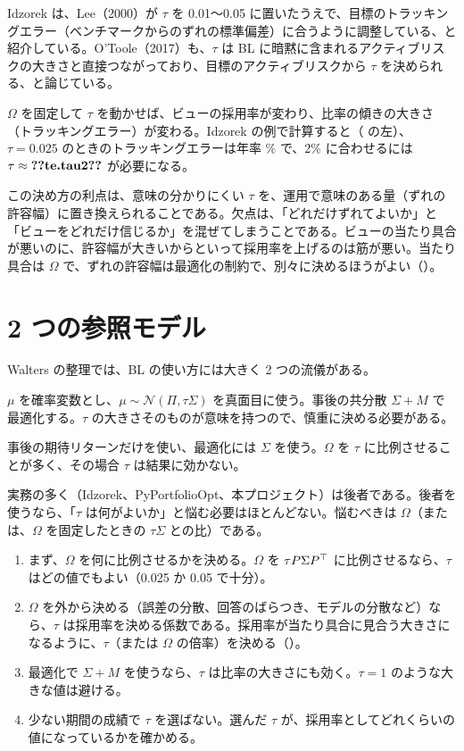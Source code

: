 Idzorek は、Lee（2000）が $\tau$ を 0.01〜0.05 に置いたうえで、目標のトラッキングエラー（ベンチマークからのずれの標準偏差）に合うように調整している、と紹介している。O'Toole（2017）も、$\tau$ は BL に暗黙に含まれるアクティブリスクの大きさと直接つながっており、目標のアクティブリスクから $\tau$ を決められる、と論じている。

$\Omega$ を固定して $\tau$ を動かせば、ビューの採用率が変わり、比率の傾きの大きさ（トラッキングエラー）が変わる。Idzorek の例で計算すると（ の左）、$\tau=0.025$ のときのトラッキングエラーは年率 \% で、2\% に合わせるには $\tau\approx\V{te.tau2}$ が必要になる。

この決め方の利点は、意味の分かりにくい $\tau$ を、運用で意味のある量（ずれの許容幅）に置き換えられることである。欠点は、「どれだけずれてよいか」と「ビューをどれだけ信じるか」を混ぜてしまうことである。ビューの当たり具合が悪いのに、許容幅が大きいからといって採用率を上げるのは筋が悪い。当たり具合は $\Omega$ で、ずれの許容幅は最適化の制約で、別々に決めるほうがよい（）。

\section{2 つの参照モデル}

Walters の整理では、BL の使い方には大きく 2 つの流儀がある。

\begin{description}[leftmargin=2em,style=nextline]
\item[標準的な参照モデル] $\mu$ を確率変数とし、$\mu\sim\mathcal N(\Pi,\tau\Sigma)$ を真面目に使う。事後の共分散 $\Sigma+M$ で最適化する。$\tau$ の大きさそのものが意味を持つので、慎重に決める必要がある。
\item[もう 1 つの参照モデル] 事後の期待リターンだけを使い、最適化には $\Sigma$ を使う。$\Omega$ を $\tau$ に比例させることが多く、その場合 $\tau$ は結果に効かない。
\end{description}

実務の多く（Idzorek、PyPortfolioOpt、本プロジェクト）は後者である。後者を使うなら、「$\tau$ は何がよいか」と悩む必要はほとんどない。悩むべきは $\Omega$（または、$\Omega$ を固定したときの $\tau\Sigma$ との比）である。

\begin{tipbox}
\begin{enumerate}
\item まず、$\Omega$ を何に比例させるかを決める。$\Omega$ を $\tau P\Sigma P^{\top}$ に比例させるなら、$\tau$ はどの値でもよい（0.025 か 0.05 で十分）。
\item $\Omega$ を外から決める（誤差の分散、回答のばらつき、モデルの分散など）なら、$\tau$ は採用率を決める係数である。採用率が当たり具合に見合う大きさになるように、$\tau$（または $\Omega$ の倍率）を決める（）。
\item 最適化で $\Sigma+M$ を使うなら、$\tau$ は比率の大きさにも効く。$\tau=1$ のような大きな値は避ける。
\item 少ない期間の成績で $\tau$ を選ばない。選んだ $\tau$ が、採用率としてどれくらいの値になっているかを確かめる。
\end{enumerate}
\end{tipbox}

